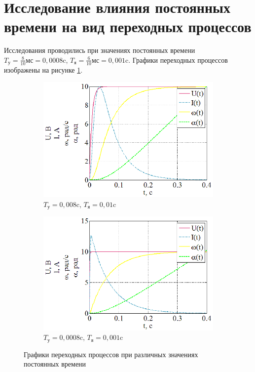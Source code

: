 \documentclass[a4paper,12pt]{article} %
\begin{document}
\section{Исследование влияния постоянных времени на вид переходных процессов}
Исследования проводились при значениях постоянных времени $T_\text{у} = \frac{8}{10} \text{мс} = 0,0008$c, $T_\text{я} = \frac{6}{10} \text{мс} = 0,001$c. Графики переходных процессов изображены на рисунке \ref{UIwa0056}.
\begin{figure}[H]
	\centering
	\begin{subfigure}[b]{0.48\textwidth}
	    \includegraphics[width = \textwidth]{scheme/T0}
		\caption{$T_\text{у} = 0,008$c, $T_\text{я} = 0,01$c}
	\end{subfigure}
	\hfill
	\begin{subfigure}[b]{0.48\textwidth}
		\includegraphics[width = \textwidth]{scheme/T1}
		\caption{$T_\text{у} = 0,0008$c, $T_\text{я} = 0,001$c}
	\end{subfigure}
	\caption{Графики переходных процессов при различных значениях постоянных времени}
	\label{UIwa0056}
\end{figure}
\end{document}
